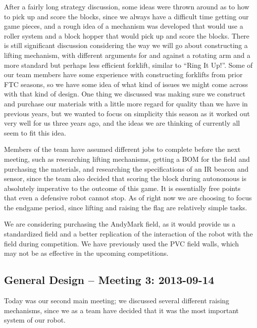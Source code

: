 After a fairly long strategy discussion, some ideas were thrown around as to how to pick up and score the blocks, since we always have a difficult time getting our game pieces, and a rough idea of a mechanism was developed that would use a roller system and a block hopper that would pick up and score the blocks. There is still significant discussion considering the way we will go about constructing a lifting mechanism, with different arguments for and against a rotating arm and a more standard but perhaps less efficient forklift, similar to ``Ring It Up!''. Some of our team members have some experience with constructing forklifts from prior FTC seasons, so we have some idea of what kind of issues we might come across with that kind of design. One thing we discussed was making sure we construct and purchase our materials with a little more regard for quality than we have in previous years, but we wanted to focus on simplicity this season as it worked out very well for us three years ago, and the ideas we are thinking of currently all seem to fit this idea.

Members of the team have assumed different jobs to complete before the next meeting, such as researching lifting mechanisms, getting a BOM for the field and purchasing the materials, and researching the specifications of an IR beacon and sensor, since the team also decided that scoring the block during autonomous is absolutely imperative to the outcome of this game. It is essentially free points that even a defensive robot cannot stop. As of right now we are choosing to focus the endgame period, since lifting and raising the flag are relatively simple tasks. 

We are considering purchasing the AndyMark field, as it would provide us a standardized field and a better replication of the interaction of the robot with the field during competition. We have previously used the PVC field walls, which may not be as effective in the upcoming competitions.

\newpage \subsection{General Design -- Meeting 3: 2013-09-14}
Today was our second main meeting; we discussed several different raising mechanisms, since we as a team have decided that it was the most important system of our robot.

